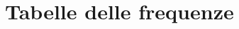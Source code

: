 \documentclass[14pt, openany, titlepage]{report} %
\begin{document}
\normalsize


\chapter{Tabelle delle frequenze}

\end{document}
